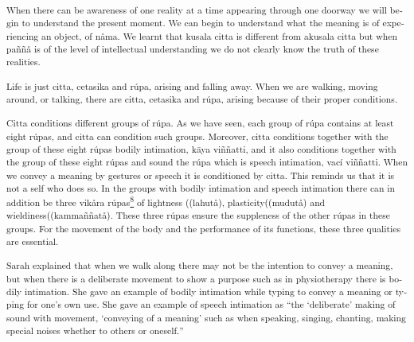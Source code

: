 \textsuperscript{\textenglish[variant=american]{When there can be
awareness of one reality at a time appearing through one doorway we will
begin to understand the present moment. }\textdutch{We can begin to
understand what the meaning is of experiencing an object, of nåma. We
learnt that kusala citta is different from akusala citta but when paññå
is of the level of intellectual understanding we do not clearly know the
truth of these realities. }}

\textsuperscript{\textdutch{Life is just citta, cetasika and rúpa,
arising and falling away. When we are walking, moving around, or
talking, there are citta, cetasika and rúpa, arising because of their
proper conditions. }}

\textsuperscript{\textdutch{Citta conditions different groups of rúpa.
As we have seen, each group of rúpa contains at least eight rúpas, and
citta can condition such groups. Moreover, citta conditions together
with the group of these eight rúpas bodily intimation,} k{{ā}}ya
viññ\textitalian{atti}\textdutch{, and it also conditions
}\textenglish[variant=american]{together with the group of these eight
r}ú\textfrench{pas}\textdutch{ and sound the rúpa which is speech
intimation, vací viññatti. When we convey a meaning by gestures or
speech it is conditioned by citta. This reminds us that it is not a self
who does so. In the groups with bodily intimation and speech intimation
there can in addition be three vikåra
rúpas\protect\hyperlink{sdfootnote8sym}{\textsuperscript{8}} of
lightness (}(lahut\textdanish{å})\textdutch{,
plasticity(}(mudut\textdanish{å}\textdutch{)}\textdutch{ and
wieldiness(}(kammaññat\textdanish{å})\textdutch{. These three rúpas
ensure the suppleness of the other rúpas in these groups.
}\textenglish[variant=american]{For the movement of the body and the
performance of its functions, these three qualities are essential.}}

\textsuperscript{\textdutch{Sarah explained that when we walk along
there may not be the intention to convey a meaning, but when there is a
deliberate movement to show a purpose such as in physiotherapy there is
bodily intimation. She gave an example of bodily intimation while typing
to convey a meaning or typing for one's own }\textdutch{use. She gave an
example of speech intimation as ``t}\textenglish[variant=american]{he
`deliberate' making of sound with movement, `conveying of a meaning'
such as when speaking, singing, chanting, making special noises whether
to others or oneself.}\textdutch{'' }}

